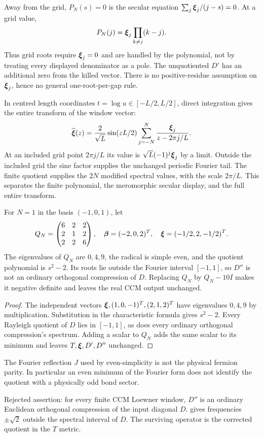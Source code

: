 Away from the grid, $P_N(s)=0$ is the secular equation
$\sum_j\boldsymbol{\xi}_j/(j-s)=0$. At a grid value,
\[
 P_N(j)=\boldsymbol{\xi}_j\prod_{k\ne j}(k-j).
\]
Thus grid roots require $\boldsymbol{\xi}_j=0$ and are handled by the polynomial,
not by treating every displayed denominator as a pole. The unquotiented
$D'$ has an additional zero from the killed vector.
There is no positive-residue assumption on $\boldsymbol{\xi}_j$, hence no general
one-root-per-gap rule.

In centred length coordinates $t=\log u\in[-L/2,L/2]$, direct
integration gives the entire transform of the window vector:
\[
 \widehat{\boldsymbol{\xi}}(z)=\frac2{\sqrt L}\sin(zL/2)
                    \sum_{j=-N}^N\frac{\boldsymbol{\xi}_j}{z-2\pi j/L}.
\]
At an included grid point $2\pi j/L$ its value is
$\sqrt L(-1)^j\boldsymbol{\xi}_j$ by a limit. Outside the included grid the sine
factor supplies the unchanged periodic Fourier tail. The finite
quotient supplies the $2N$ modified spectral values, with the scale
$2\pi/L$. This separates the finite polynomial, the meromorphic
secular display, and the full entire transform.

\begin{proposition}
\label{prop:ccm-tn-no-naive-compression}
For $N=1$ in the basis $(-1,0,1)$, let
\[
 Q_N=\begin{pmatrix}6&2&2\\2&1&2\\2&2&6\end{pmatrix},\quad
 \boldsymbol{\beta}=(-2,0,2)^T,\quad\boldsymbol{\xi}=(-1/2,2,-1/2)^T.
\]
The eigenvalues of $Q_N$ are $0,4,9$, the radical is simple even,
and the quotient polynomial is $s^2-2$. Its roots lie outside the
Fourier interval $[-1,1]$, so $D''$ is not an ordinary orthogonal
compression of $D$. Replacing $Q_N$ by $Q_N-10I$ makes it negative
definite and leaves the real CCM output unchanged.
\end{proposition}
\begin{proof}
The independent vectors $\boldsymbol{\xi},(1,0,-1)^T,(2,1,2)^T$ have eigenvalues
$0,4,9$ by multiplication. Substitution in the characteristic formula
gives $s^2-2$. Every Rayleigh quotient of $D$ lies in $[-1,1]$,
as does every ordinary orthogonal compression's spectrum.
Adding a scalar to $Q_N$ adds the same scalar to its minimum and
leaves $T,\boldsymbol{\xi},D',D''$ unchanged.
\end{proof}

The Fourier reflection $J$ used by even-simplicity is not the physical
fermion parity. In particular an even minimum of the Fourier form
does not identify the quotient with a physically odd bond sector.

\begin{observation}
\label{obs:ccm-tn-naive-compression}
Rejected assertion: for every finite CCM Loewner window, $D''$ is an
ordinary Euclidean orthogonal compression of the input diagonal $D$.
 gives frequencies
$\pm\sqrt2$ outside the spectral interval of $D$.
The surviving operator is the corrected quotient in the $T$ metric.
\end{observation}
